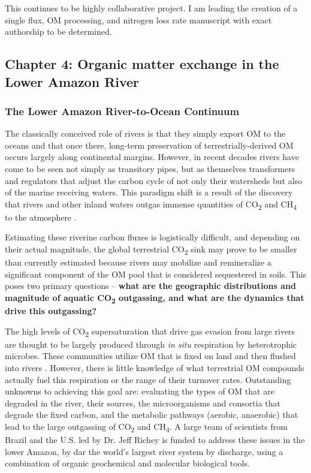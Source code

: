 \documentclass[12pt, letterpaper, twoside]{article}
\begin{document}
This continues to be highly collaborative project. I am leading the creation of a single flux, OM processing, and nitrogen loss rate manuscript with exact authorship to be determined. 

\subsection{Chapter 4: Organic matter exchange in the Lower Amazon River}

\subsubsection{The Lower Amazon River-to-Ocean Continuum}

The classically conceived role of rivers is that they simply export OM to the oceans and that once there, long-term preservation of terrestrially-derived OM occurs largely along continental margins. However, in recent decades rivers have come to be seen not simply as transitory pipes, but as themselves transformers and regulators that adjust the carbon cycle of not only their watersheds but also of the marine receiving waters. This paradigm shift is a result of the discovery that rivers and other inland waters outgas immense quantities of CO\textsubscript{2} and CH\textsubscript{4} to the atmosphere \cite{butman_significant_2011, richey_outgassing_2002}. 

Estimating these riverine carbon fluxes is logistically difficult, and depending on their actual magnitude, the global terrestrial CO\textsubscript{2} sink may prove to be smaller than currently estimated because rivers may mobilize and remineralize a significant component of the OM pool that is considered sequestered in soils. This poses two primary questions – \textbf{what are the geographic distributions and magnitude of aquatic CO\textsubscript{2} outgassing, and what are the dynamics that drive this outgassing?} 

The high levels of CO\textsubscript{2} supersaturation that drive gas evasion from large rivers are thought to be largely produced through \textit{in situ} respiration by heterotrophic microbes. These communities utilize OM that is fixed on land and then flushed into rivers \cite{mayorga_young_2005, ward_degradation_2013, ward_reactivity_2016}. However, there is little knowledge of what terrestrial OM compounds actually fuel this respiration or the range of their turnover rates.  Outstanding unknowns to achieving this goal are: evaluating the types of OM that are degraded in the river, their sources, the microorganisms and consortia that degrade the fixed carbon, and the metabolic pathways (aerobic, anaerobic) that lead to the large outgassing of CO\textsubscript{2} and CH\textsubscript{4}. A large team of scientists from Brazil and the U.S. led by Dr. Jeff Richey is funded to address these issues in the lower Amazon, by dar the world's largest river system by discharge, using a combination of organic geochemical and molecular biological tools.
\end{document}
